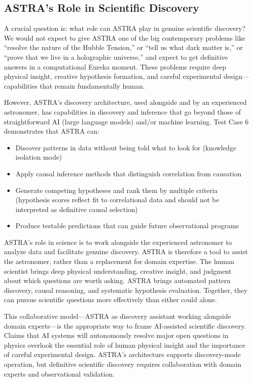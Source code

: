 \documentclass[usenatbib]{rasti}
\begin{document}
\subsection{ASTRA's Role in Scientific Discovery}

A crucial question is: what role can ASTRA play in genuine scientific discovery? We would not expect to give ASTRA one of the big contemporary problems like ``resolve the nature of the Hubble Tension,'' or ``tell us what dark matter is,'' or ``prove that we live in a holographic universe,'' and expect to get definitive answers in a computational Eureka moment. These problems require deep physical insight, creative hypothesis formation, and careful experimental design---capabilities that remain fundamentally human.

However, ASTRA's discovery architecture, used alongside and by an experienced astronomer, has capabilities in discovery and inference that go beyond those of straightforward AI (large language models) and/or machine learning. Test Case 6 demonstrates that ASTRA can:
\begin{itemize}
\item Discover patterns in data without being told what to look for (knowledge isolation mode)
\item Apply causal inference methods that distinguish correlation from causation
\item Generate competing hypotheses and rank them by multiple criteria (hypothesis scores reflect fit to correlational data and should not be interpreted as definitive causal selection)
\item Produce testable predictions that can guide future observational programs
\end{itemize}

ASTRA's role in science is to work alongside the experienced astronomer to analyze data and facilitate genuine discovery. ASTRA is therefore a tool to assist the astronomer, rather than a replacement for domain expertise. The human scientist brings deep physical understanding, creative insight, and judgment about which questions are worth asking. ASTRA brings automated pattern discovery, causal reasoning, and systematic hypothesis evaluation. Together, they can pursue scientific questions more effectively than either could alone.

This collaborative model---ASTRA as discovery assistant working alongside domain experts---is the appropriate way to frame AI-assisted scientific discovery. Claims that AI systems will autonomously resolve major open questions in physics overlook the essential role of human physical insight and the importance of careful experimental design. ASTRA's architecture supports discovery-mode operation, but definitive scientific discovery requires collaboration with domain experts and observational validation.
\end{document}
